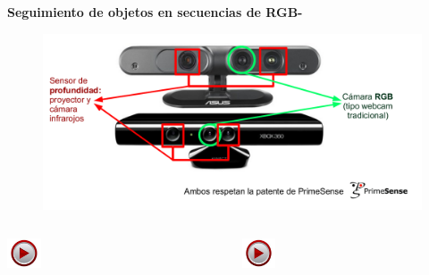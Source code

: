 \documentclass[]{beamer}
\newcommand{\video}[1]{
    \begin{center}
        \href{run:#1}{
            \includegraphics[width=1cm]{img/play.jpeg}
        }
    \end{center}
}
\begin{document}
\begin{frame}{}
    \textbf{Seguimiento de objetos en secuencias de  RGB-}
    \begin{figure}[t]
        \centering
        \includegraphics[width=\textwidth]{img/sensores_rgbd.png}
    \end{figure}
    \begin{columns}
        \begin{column}{2cm}
            \video{videos/desk_1.ogv}
        \end{column}
        \begin{column}{2cm}
            \video{videos/rgbd.ogv}
        \end{column}
    \end{columns}




\end{frame}
\end{document}
